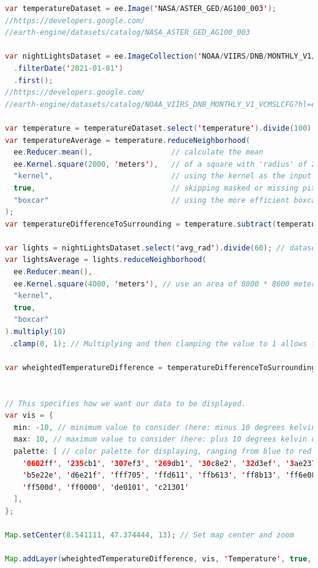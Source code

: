 \documentclass[../Main.tex]{subfiles}
\begin{document}
\begin{lstlisting}[language=Java,
                   breaklines=true,
                   breakatwhitespace=true,
                   keepspaces=true,
                   basicstyle=\ttfamily\small]
var temperatureDataset = ee.Image('NASA/ASTER_GED/AG100_003');
//https://developers.google.com/
//earth-engine/datasets/catalog/NASA_ASTER_GED_AG100_003

var nightLightsDataset = ee.ImageCollection('NOAA/VIIRS/DNB/MONTHLY_V1/VCMSLCFG')
  .filterDate('2021-01-01')
  .first();
//https://developers.google.com/
//earth-engine/datasets/catalog/NOAA_VIIRS_DNB_MONTHLY_V1_VCMSLCFG?hl=en
  
var temperature = temperatureDataset.select('temperature').divide(100); // dataset is in 1/100 kelvin
var temperatureAverage = temperature.reduceNeighborhood(
  ee.Reducer.mean(),                  // calculate the mean
  ee.Kernel.square(2000, 'meters'),   // of a square with 'radius' of 2000 m (which is 4000 * 4000 m)
  "kernel",                           // using the kernel as the input weight
  true,                               // skipping masked or missing pixels in calculation
  "boxcar"                            // using the more efficient boxcar method to compute 
);
var temperatureDifferenceToSurrounding = temperature.subtract(temperatureAverage); 

var lights = nightLightsDataset.select('avg_rad').divide(60); // dataset is in range ~ 0 - 60, we want it normalized (0 - 1)
var lightsAverage = lights.reduceNeighborhood(
  ee.Reducer.mean(),
  ee.Kernel.square(4000, 'meters'), // use an area of 8000 * 8000 meters this time
  "kernel",
  true,
  "boxcar"
).multiply(10)
 .clamp(0, 1); // Multiplying and then clamping the value to 1 allows for light values as low as 0.1 to pass through the whole temperature in the next step

var wheightedTemperatureDifference = temperatureDifferenceToSurrounding.multiply(lightsAverage); // use the lights as a kind of mask, so we only see temperature in cities


// This specifies how we want our data to be displayed.
var vis = {
  min: -10, // minimum value to consider (here: minus 10 degrees kelvin difference)
  max: 10, // maximum value to consider (here: plus 10 degrees kelvin difference)
  palette: [ // color palette for displaying, ranging from blue to red 
    '0602ff', '235cb1', '307ef3', '269db1', '30c8e2', '32d3ef', '3ae237',
    'b5e22e', 'd6e21f', 'fff705', 'ffd611', 'ffb613', 'ff8b13', 'ff6e08',
    'ff500d', 'ff0000', 'de0101', 'c21301'
  ],
};

Map.setCenter(8.541111, 47.374444, 13); // Set map center and zoom

Map.addLayer(wheightedTemperatureDifference, vis, 'Temperature', true, 0.75); // Add our data as a map layer, with 75% opacity 
\end{lstlisting}
\end{document}
